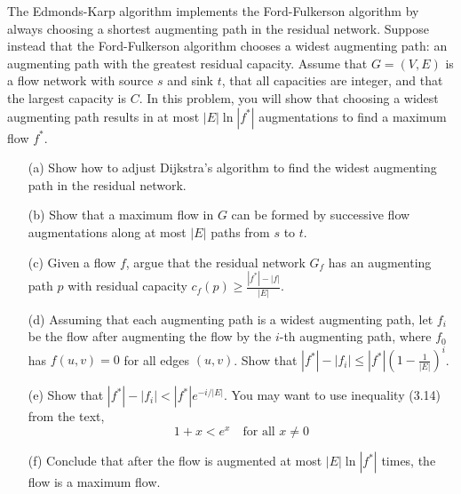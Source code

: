 \documentclass[10pt,letter,notitlepage]{article}
\newcounter{exercise}
\begin{document}
\begin{exercise}[(18 marks)]

The Edmonds-Karp algorithm implements the Ford-Fulkerson algorithm by always choosing a shortest augmenting path in the residual network. Suppose instead that the Ford-Fulkerson algorithm chooses a widest augmenting path: an augmenting path with the greatest residual capacity. Assume that $G = (V, E)$ is a flow network with source $s$ and sink $t$, that all capacities are integer, and that the largest capacity is $C$. In this problem, you will show that choosing a widest augmenting path results in at most $|E| \ln |f^*|$ augmentations to find a maximum flow $f^*$.

\begin{enumerate}
    \item[(a)] Show how to adjust Dijkstra’s algorithm to find the widest augmenting path in the residual network.
    
    \item[(b)] Show that a maximum flow in $G$ can be formed by successive flow augmentations along at most $|E|$ paths from $s$ to $t$.
    
    \item[(c)] Given a flow $f$, argue that the residual network $G_f$ has an augmenting path $p$ with residual capacity $c_f(p) \geq \frac{|f^*| - |f|}{|E|}$.
    
    \item[(d)] Assuming that each augmenting path is a widest augmenting path, let $f_i$ be the flow after augmenting the flow by the $i$-th augmenting path, where $f_0$ has $f(u, v) = 0$ for all edges $(u, v)$. Show that $|f^*| - |f_i| \leq |f^*|(1 - \frac{1}{|E|})^i$.
    
    \item[(e)] Show that $|f^*| - |f_i| < |f^*|e^{-i/|E|}$. You may want to use inequality (3.14) from the text,
    \[
    1 + x < e^x \quad \text{for all } x \neq 0
    \]

    \item[(f)] Conclude that after the flow is augmented at most $|E| \ln |f^*|$ times, the flow is a maximum flow.
\end{enumerate}

\end{exercise}
\end{document}
